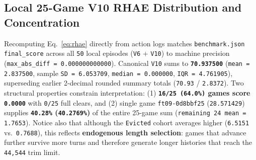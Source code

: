 \documentclass[10pt]{article}
\newcommand{\code}[1]{\texttt{#1}}
\begin{document}
\subsection{Local 25-Game V10 RHAE Distribution and Concentration}
Recomputing Eq.~\ref{eq:rhae} directly from action logs matches \code{benchmark.json} \code{final\_score} across all \code{50} local episodes (\code{V6} + \code{V10}) to machine precision (\code{max\_abs\_diff = 0.000000000000}). Canonical \code{V10} sums to \textbf{\code{70.937500}} (\code{mean = 2.837500}, sample \code{SD = 6.053709}, \code{median = 0.000000}, \code{IQR = 4.761905}), superseding earlier 2-decimal rounded summary totals (\code{70.93} / \code{2.8372}). Two structural properties constrain interpretation: (1) \textbf{\code{16/25 (64.0\%)} games score \code{0.0000}} with \code{0/25} full clears, and (2) single game \code{ft09-0d8bbf25} (\code{28.571429}) supplies \textbf{\code{40.28\%} (\code{40.2769\%})} of the entire 25-game sum (\code{remaining 24 mean = 1.7653}). Notice also that although the \code{Evicted} cohort averages higher (\code{6.5151} vs.\ \code{0.7688}), this reflects \textbf{endogenous length selection}: games that advance further survive more turns and therefore generate longer histories that reach the \code{44,544} trim limit.
\end{document}
